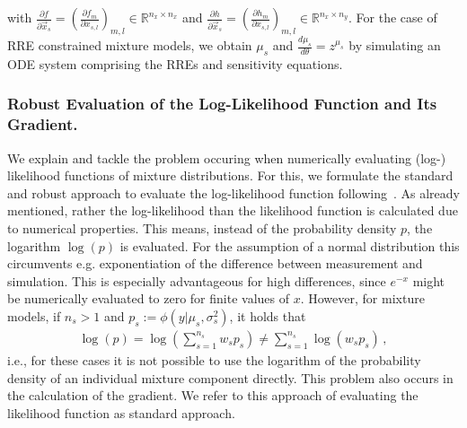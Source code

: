 \documentclass{llncs}
\newcommand{\x}{\vec{x}}
\begin{document}
with $\frac{\partial f}{\partial \x_s} = \left(\frac{\partial f_m}{\partial x_{s,l}}\right)_{m,l} \in \mathbb{R}^{n_x \times n_x}$ and
$\frac{\partial h}{\partial \x_s} = \left(\frac{\partial h_m}{\partial x_{s,l}}\right)_{m,l} \in \mathbb{R}^{n_x \times n_y}$. 
For the case of RRE constrained mixture models, we obtain $\mu_s$ and $\frac{d \mu_s}{d \theta} = z^{\mu_s}$ by simulating an ODE system comprising the RREs and sensitivity equations. 

\subsubsection{Robust Evaluation of the Log-Likelihood Function and Its Gradient.}
We explain and tackle the problem occuring when numerically evaluating (log-) \mbox{likelihood} functions of mixture distributions. For this, we formulate the standard and robust approach to evaluate the log-likelihood function following~\cite{Loos2016}. As already mentioned, rather the log-likelihood than the likelihood function is calculated due to numerical properties. This means, instead of the probability density $p$, the logarithm $\log(p)$ is evaluated. For the assumption of a normal distribution this circumvents e.g. exponentiation of the difference between measurement and simulation. This is especially advantageous for high differences, since $e^{-x}$ might be numerically evaluated to zero for finite values of $x$. However, for mixture models, if $n_s > 1$ and $p_s := \phi(y|\mu_s,\sigma_s^2)$, it holds that
 \begin{align*}
\log(p) = \log\left(\sum_{s=1}^{n_s} w_s p_s\right) \neq \sum_{s=1}^{n_s}\log\left(w_s p_s\right)\,,
\end{align*}
i.e., for these cases it is not possible to use the logarithm of the probability density of an individual mixture component directly. This problem also occurs in the calculation of the gradient. We refer to this approach of evaluating the likelihood function as standard approach. 
\end{document}
